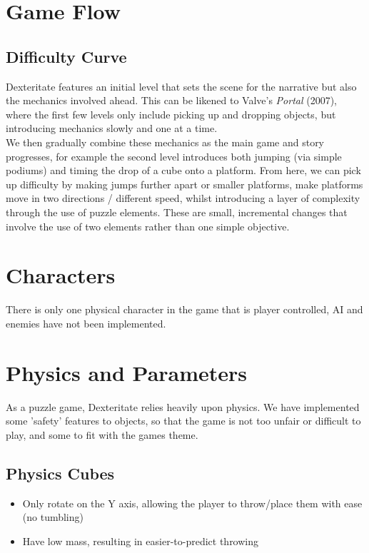 \documentclass[11pt]{article}
\begin{document}




\section{Game Flow}

\subsection{Difficulty Curve}
Dexteritate features an initial level that sets the scene for the narrative but also the mechanics involved ahead. This can be likened to Valve's \textit{Portal} (2007), where the first few levels only include picking up and dropping objects, but introducing mechanics slowly and one at a time. \\

We then gradually combine these mechanics as the main game and story progresses, for example the second level introduces both jumping (via simple podiums) and timing the drop of a cube onto a platform. From here, we can pick up difficulty by making jumps further apart or smaller platforms, make platforms move in two directions / different speed, whilst introducing a layer of complexity through the use of puzzle elements. These are small, incremental changes that involve the use of two elements rather than one simple objective. 



\section{Characters}
There is only one physical character in the game that is player controlled, AI and enemies have not been implemented. 


\section{Physics and Parameters}
As a puzzle game, Dexteritate relies heavily upon physics. We have implemented some 'safety' features to objects, so that the game is not too unfair or difficult to play, and some to fit with the games theme.

\subsection{Physics Cubes}
\begin{itemize}
	\item Only rotate on the Y axis, allowing the player to throw/place them with ease (no tumbling)
	\item Have low mass, resulting in easier-to-predict throwing
\end{itemize}
\end{document}
